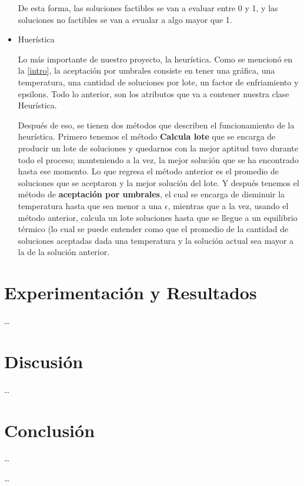 \documentclass{article}
\newcommand{\tbf}[1]{\textbf{#1}}
\begin{document}
\begin{itemize}
      De esta forma, las soluciones factibles se van a evaluar entre 
      0 y 1, y las soluciones no factibles se van a evualar a algo 
      mayor que 1.

    \item Huerística

      Lo más importante de nuestro proyecto, la heurística. Como se 
      mencionó en la \ref{intro}, la aceptación por umbrales consiste 
      en tener una gráfica, una temperatura, una cantidad de soluciones 
      por lote, un factor de enfriamiento y epsilons. Todo lo anterior,
      son los atributos que va a contener nuestra clase Heurística.
      
      Después de eso, se tienen dos métodos que describen el 
      funcionamiento de la heurística. Primero tenemos el método
      \tbf{Calcula lote} que se encarga de producir un lote de soluciones
      y quedarnos con la mejor aptitud tuvo durante todo el proceso;
      manteniendo a la vez, la mejor solución que se ha encontrado hasta 
      ese momento. Lo que regresa el método anterior es el promedio de 
      soluciones que se aceptaron y la mejor solución del lote. Y después
      tenemos el método de \tbf{aceptación por umbrales}, el cual se encarga
      de disminuir la temperatura hasta que sea menor a una $\epsilon$,
      mientras que a la vez, usando el método anterior, calcula un lote 
      soluciones hasta que se llegue a un equilibrio térmico (lo cual se 
      puede entender como que el promedio de la cantidad de soluciones 
      aceptadas dada una temperatura y la solución actual sea mayor a la 
      de la solución anterior.
  \end{itemize}
  

  \section{Experimentación y Resultados} \label{results}
  \ldots

  \section{Discusión} \label{discussion}
  \ldots

  \section{Conclusión} \label{conclusion}
  \ldots

  \begin{thebibliography}{9}

     \ldots

  \end{thebibliography}
\end{document}

